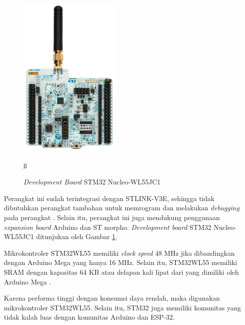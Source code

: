 \begin{figure}[ht]
	\centering
	\includegraphics[width=5cm]{contents/chapter-2/stm32-wl55jc1.jpg}
	\caption{\textit{Development Board} STM32 Nucleo-WL55JC1}
	\label{Fig: STM32 Nucleo-WL55JC1}ß
\end{figure}

Perangkat ini sudah terintegrasi dengan STLINK-V3E, sehingga tidak dibutuhkan perangkat tambahan untuk memrogram dan melakukan \textit{debugging} pada perangkat \cite{STMicroelectronics2022}. Selain itu, perangkat ini juga mendukung penggunaan \textit{expansion board} Arduino dan ST morpho. \textit{Development board} STM32 Nucleo-WL55JC1 ditunjukan oleh Gambar \ref{Fig: STM32 Nucleo-WL55JC1}.

Mikrokontroler STM32WL55 memiliki \textit{clock speed} 48 MHz jika dibandingkan dengan Arduino Mega yang hanya 16 MHz. Selain itu, STM32WL55 memiliki SRAM dengan kapasitas 64 KB atau delapan kali lipat dari yang dimiliki oleh Arduino Mega \cite{STMicroelectronics2022b}.

Karena performa tinggi dengan konsumsi daya rendah, maka digunakan mikrokontroler STM32WL55. Selain itu, STM32 juga memiliki komunitas yang tidak kalah luas dengan komunitas Arduino dan ESP-32.